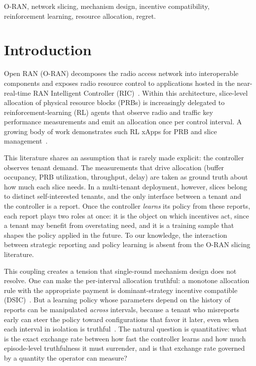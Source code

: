 \documentclass[conference]{IEEEtran}
\theoremstyle{definition}
\theoremstyle{remark}
\begin{document}
\begin{IEEEkeywords}
O-RAN, network slicing, mechanism design, incentive compatibility, reinforcement learning, resource allocation, regret.
\end{IEEEkeywords}

\section{Introduction}\label{sec:intro}
Open RAN (O-RAN) decomposes the radio access network into interoperable components and exposes radio resource control to applications hosted in the near-real-time RAN Intelligent Controller (RIC)~\cite{ref:oran}. Within this architecture, slice-level allocation of physical resource blocks (PRBs) is increasingly delegated to reinforcement-learning (RL) agents that observe radio and traffic key performance measurements and emit an allocation once per control interval. A growing body of work demonstrates such RL xApps for PRB and slice management~\cite{ref:coloran,ref:slicing}.

This literature shares an assumption that is rarely made explicit: the controller observes tenant demand. The measurements that drive allocation (buffer occupancy, PRB utilization, throughput, delay) are taken as ground truth about how much each slice needs. In a multi-tenant deployment, however, slices belong to distinct self-interested tenants, and the only interface between a tenant and the controller is a report. Once the controller \emph{learns} its policy from these reports, each report plays two roles at once: it is the object on which incentives act, since a tenant may benefit from overstating need, and it is a training sample that shapes the policy applied in the future. To our knowledge, the interaction between strategic reporting and policy learning is absent from the O-RAN slicing literature.

This coupling creates a tension that single-round mechanism design does not resolve. One can make the per-interval allocation truthful: a monotone allocation rule with the appropriate payment is dominant-strategy incentive compatible (DSIC)~\cite{ref:myerson}. But a learning policy whose parameters depend on the history of reports can be manipulated \emph{across} intervals, because a tenant who misreports early can steer the policy toward configurations that favor it later, even when each interval in isolation is truthful~\cite{ref:huh}. The natural question is quantitative: what is the exact exchange rate between how fast the controller learns and how much episode-level truthfulness it must surrender, and is that exchange rate governed by a quantity the operator can measure?
\end{document}
